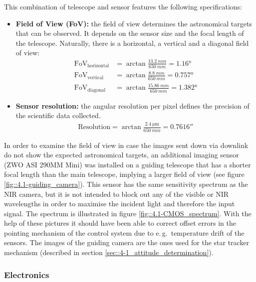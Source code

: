 This combination of telescope and sensor features the following specifications:

\begin{itemize}
	\item \textbf{Field of View (FoV):} the field of view determines the astronomical targets that can be observed. It depends on the sensor size and the focal length of the telescope. Naturally, there is a horizontal, a vertical and a diagonal field of view:
	\begin{align}
		\text{FoV}_\text{horizontal} &= \arctan \frac{\SI{13.2}{mm}}{\SI{650}{mm}} = \ang{1,16} \\
		\text{FoV}_\text{vertical} &= \arctan \frac{\SI{8.8}{mm}}{\SI{650}{mm}} = \ang{0,757} \\
		\text{FoV}_\text{diagonal} &= \arctan \frac{\SI{15,86}{mm}}{\SI{650}{mm}} = \ang{1,382}
	\end{align}
	\item \textbf{Sensor resolution:} the angular resolution per pixel defines the precision of the scientific data collected.
	\begin{align}
		\text{Resolution} = \arctan \frac{\SI{2,4}{\um}}{\SI{650}{mm}} %
		 = \ang{;;0,7616}
	\end{align}
\end{itemize}

In order to examine the field of view in case the images sent down via downlink do not show the expected astronomical targets, an additional imaging sensor (ZWO ASI 290MM Mini) was installed on a guiding telescope that has a shorter focal length than the main telescope, implying a larger field of view (see figure \ref{fig::4.1-guiding_camera}). This sensor has the same sensitivity spectrum as the NIR camera, but it is not intended to block out any of the visible or NIR wavelengths in order to maximise the incident light and therefore the input signal. The spectrum is illustrated in figure \ref{fig::4.1-CMOS_spectrum}. With the help of these pictures it should have been able to correct offset errors in the pointing mechanism of the control system due to e.\,g.~temperature drift of the sensors. The images of the guiding camera are the ones used for the star tracker mechanism (described in section \mbox{\ref{sec::4-1_attitude_determination}}).



\subsubsection{Electronics}

